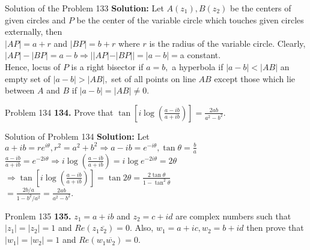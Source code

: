 \documentclass[aspectratio=169,8pt]{beamer}
\begin{document}
\begin{frame}{Solution of the Problem 133}
  \textbf{Solution:} Let $A(z_1), B(z_2)$ be the centers of given circles and $P$ be the center of the variable circle which
  touches given circles externally, then\\
  \vspace*{0.2cm}
  $|AP| = a + r$ and $|BP| = b + r$ where $r$ is the radius of the variable circle. Clearly,\\
  \vspace*{0.2cm}
  $|AP| - |BP| = a - b \Rightarrow ||AP| - |BP|| = |a - b| = $a constant.\\
  \vspace*{0.2cm}
  Hence, locus of $P$ is a right bisector if $a = b,$ a hyperbola if $|a - b| < |AB|$ an empty set of $|a - b|>|AB|,$ set of all
  points on line $AB$ except those which lie between $A$ and $B$ if $|a - b| = |AB|\neq 0.$
\end{frame}
\begin{frame}{Problem 134}
  \textbf{134.} Prove that $\tan\left[i\log\left(\frac{a - ib}{a + ib}\right)\right] = \frac{2ab}{a^2 - b^2}$.
\end{frame}
\begin{frame}{Solution of Problem 134}
  \textbf{Solution:} Let $a + ib = re^{i\theta}, r^2 = a^2 + b^2 \Rightarrow a - ib = e^{-i\theta}, \tan\theta = \frac{b}{a}$\\
  \vspace*{0.2cm}
  $\frac{a - ib}{a + ib} = e^{-2i\theta} \Rightarrow i\log\left(\frac{a - ib}{a + ib}\right) = i\log e^{-2i\theta} = 2\theta$\\
  \vspace*{0.2cm}
  $\Rightarrow \tan\left[i\log\left(\frac{a - ib}{a + ib}\right)\right] = \tan2\theta = \frac{2\tan\theta}{1 - \tan^2\theta}$\\
  \vspace*{0.2cm}
  $= \frac{2b/a}{1 - b^2/a^2} = \frac{2ab}{a^2 - b^2}$.
\end{frame}
\begin{frame}{Pronlem 135}
  \textbf{135.} $z_1 = a + ib$ and $z_2 = c + id$ are complex numbers such that $|z_1| = |z_2| = 1$ and $Re(z_1\overline{z_2}) =
  0.$ Also, $w_1 = a + ic, w_2 = b + id$ then prove that $|w_1| = |w_2| = 1$ and $Re(w_1\overline{w_2}) = 0.$
\end{frame}
\end{document}
